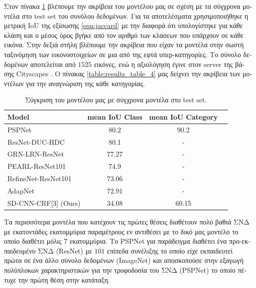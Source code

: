 \textgreek{Στον πίνακα }\ref{table:results_table_3} \textgreek{βλέπουμε την ακρίβεια του μοντέλου μας σε σχέση με τα σύγχρονα μοντέλα στο }test set \textgreek{του συνόλου δεδομένων. Για τα αποτελέσματα χρησιμοποιήθηκε η μετρική }IoU \textgreek{της εξίσωσης }\ref{eqn:jaccard} \textgreek{με την διαφορά ότι υπολογίστηκε για κάθε κλάση και ο μέσος όρος βγήκε από τον αριθμό των κλάσεων που υπάρχουν σε κάθε εικόνα. Στην δεξιά στήλη βλέπουμε την ακρίβεια που είχαν τα μοντέλα στην σωστή ταξινόμηση των εικονοστοιχείων σε μια από της εφτά υπερ-κατηγορίες. Το σύνολο δεδομένων αποτελείται από $1525$ εικόνες, ενώ η αξιολόγηση έγινε στον }server \textgreek{της βάσης }Cityscapes \cite{Cityscapes}. \textgreek{Ο πίνακας }\ref{table:results_table_4} \textgreek{μας δείχνει την ακρίβεια των μοντέλων για την αναγνώριση της κάθε κατηγορίας.}

\begin{table}[H]
\centering
\begin{tabular}{lccc}
\hline
\textbf{Model}  & \textbf{mean IoU Class} & \textbf{mean IoU Category}\\ \hline
PSPNet \cite{pspnet}  & 80.2     & 90.2   \\ %
ResNet-DUC-HDC \cite{duc_hdc} & 80.1 & -\\
GRN-LRN-ResNet \cite{DBLP:conf/ijcai/ZhangTLLY17} & 77.27& - \\
PEARL-ResNet101 \cite{video_scene_parsing}& 74.9 & -\\ %
RefineNet-ResNet101 \cite{RefineNet}& 73.06    & -         \\ %
AdapNet \cite{adapNet}& 72.91 & -\\
SD-CNN-CRF{[}3{]} (Ours)  & 34.08  &  60.15  \\ %
\end{tabular}

\caption[\textgreek{Σύγκριση με σύγχρονα μοντέλα}]{\textgreek{Σύγκριση του μοντέλου μας με σύγχρονα μοντέλα στο }test set.}\label{table:results_table_3}
\end{table}

\textgreek{Τα περισσότερα μοντέλα που κατέχουν τις πρώτες θέσεις διαθέτουν πολύ βαθιά ΣΝΔ με εκατοντάδες εκατομμύρια παραμέτρους εν αντιθέσει με το δικό μας μοντέλο το οποίο διαθέτει μόλις $7$ εκατομμύρια. Το }PSPNet \textgreek{για παράδειγμα διαθέτει ένα προ-εκπαιδευμένο ΣΝΔ }(ResNet) \textgreek{με $101$ επίπεδα συνέλιξης το οποίο είχε εκπαιδευτεί πρώτα σε ένα άλλο σύνολο δεδομένων }(ImageNet) \textgreek{και αποσκοπούσε στην εξαγωγή πολύπλοκων χαρακτηριστικών για την τροφοδοσία του ΣΝΔ }(PSPNet) \textgreek{ το οποίο πέτυχε την πρώτη θέση στην κατάταξη.}

